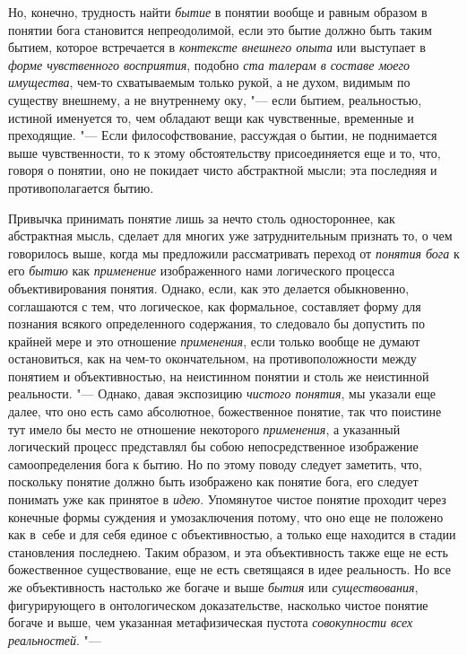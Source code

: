 Но, конечно, трудность найти {\em бытие} в понятии
вообще и равным образом в понятии бога становится непреодолимой, если это
бытие должно быть таким бытием, которое встречается в
{\em контексте внешнего опыта} или выступает в {\em форме
чувственного восприятия}, подобно {\em ста талерам в составе моего
имущества}, чем-то схватываемым только рукой, а не духом,
видимым по существу внешнему, а не внутреннему оку, "--- если
бытием, реальностью, истиной именуется то, чем обладают вещи как
чувственные, временные и преходящие. "--- Если
философствование, рассуждая о бытии, не поднимается выше чувственности, то
к этому обстоятельству присоединяется еще и то, что, говоря о понятии, оно
не покидает чисто абстрактной мысли; эта последняя и противополагается бытию.

Привычка принимать понятие лишь за нечто столь одностороннее,
как абстрактная мысль, сделает для многих уже затруднительным признать то,
о чем говорилось выше, когда мы предложили рассматривать переход от
{\em понятия бога} к его {\em бытию} как {\em применение}
изображенного нами логического процесса объективирования
понятия. Однако, если, как это делается обыкновенно, соглашаются с тем, что
логическое, как формальное, составляет форму для познания всякого
определенного содержания, то следовало бы допустить по крайней мере и это
отношение {\em применения},
если только вообще не думают остановиться, как на чем-то
окончательном, на противоположности между понятием и объективностью, на
неистинном понятии и столь же неистинной реальности. "---
Однако, давая экспозицию {\em чистого понятия}, мы
указали еще далее, что оно есть само абсолютное, божественное понятие, так
что поистине тут имело бы место не отношение некоторого {\em применения}, а
указанный логический процесс представлял бы собою непосредственное
изображение самоопределения бога к бытию. Но по этому поводу следует
заметить, что, поскольку понятие должно быть изображено как понятие бога,
его следует понимать уже как принятое в {\em идею}. Упомянутое
чистое понятие проходит через конечные формы суждения и
умозаключения потому, что оно еще не положено как в~себе и для себя единое
с объективностью, а только еще находится в стадии становления последнею.
Таким образом, и эта объективность также еще не есть божественное
существование, еще не есть светящаяся в идее реальность. Но все же
объективность настолько же богаче и выше {\em бытия} или {\em существования},
фигурирующего в онтологическом доказательстве, насколько
чистое понятие богаче и выше, чем указанная метафизическая пустота
{\em совокупности всех реальностей}. "---
